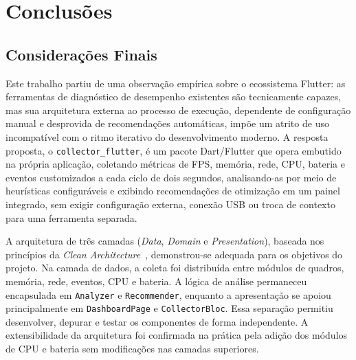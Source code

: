 
\chapter{Conclusões}

\section{Considerações Finais}

Este trabalho partiu de uma observação empírica sobre o ecossistema Flutter: as ferramentas de diagnóstico de desempenho existentes são tecnicamente capazes, mas sua arquitetura externa ao processo de execução, dependente de configuração manual e desprovida de recomendações automáticas, impõe um atrito de uso incompatível com o ritmo iterativo do desenvolvimento moderno. A resposta proposta, o \texttt{collector\_flutter}, é um pacote Dart/Flutter que opera embutido na própria aplicação, coletando métricas de FPS, memória, rede, CPU, bateria e eventos customizados a cada ciclo de dois segundos, analisando-as por meio de heurísticas configuráveis e exibindo recomendações de otimização em um painel integrado, sem exigir configuração externa, conexão USB ou troca de contexto para uma ferramenta separada.

A arquitetura de três camadas (\textit{Data}, \textit{Domain} e \textit{Presentation}), baseada nos princípios da \textit{Clean Architecture}~\cite{martin2018clean}, demonstrou-se adequada para os objetivos do projeto. Na camada de dados, a coleta foi distribuída entre módulos de quadros, memória, rede, eventos, CPU e bateria. A lógica de análise permaneceu encapsulada em \texttt{Analyzer} e \texttt{Recommender}, enquanto a apresentação se apoiou principalmente em \texttt{DashboardPage} e \texttt{CollectorBloc}. Essa separação permitiu desenvolver, depurar e testar os componentes de forma independente. A extensibilidade da arquitetura foi confirmada na prática pela adição dos módulos de CPU e bateria sem modificações nas camadas superiores.

